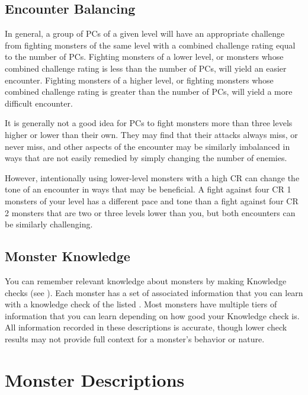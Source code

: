     \subsection{Encounter Balancing}\label{Encounter Balancing}
        In general, a group of PCs of a given level will have an appropriate challenge from fighting monsters of the same level with a combined challenge rating equal to the number of PCs.
        Fighting monsters of a lower level, or monsters whose combined challenge rating is less than the number of PCs, will yield an easier encounter.
        Fighting monsters of a higher level, or fighting monsters whose combined challenge rating is greater than the number of PCs, will yield a more difficult encounter.

        It is generally not a good idea for PCs to fight monsters more than three levels higher or lower than their own.
        They may find that their attacks always miss, or never miss, and other aspects of the encounter may be similarly imbalanced in ways that are not easily remedied by simply changing the number of enemies.

        However, intentionally using lower-level monsters with a high CR can change the tone of an encounter in ways that may be beneficial.
        A fight against four CR 1 monsters of your level has a different pace and tone than a fight against four CR 2 monsters that are two or three levels lower than you, but both encounters can be similarly challenging.

    \subsection{Monster Knowledge}
        You can remember relevant knowledge about monsters by making Knowledge checks (see ).
        Each monster has a set of associated information that you can learn with a knowledge check of the listed .
        Most monsters have multiple tiers of information that you can learn depending on how good your Knowledge check is.
        All information recorded in these descriptions is accurate, though lower check results may not provide full context for a monster's behavior or nature.

\section{Monster Descriptions}


